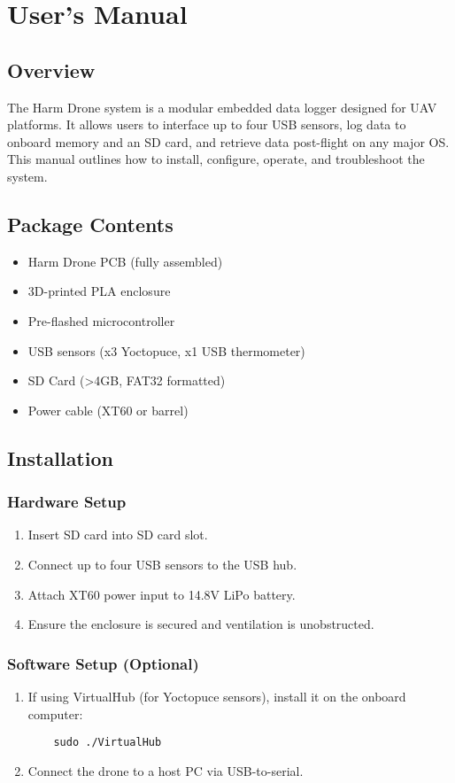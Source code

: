 \documentclass[../main.tex]{subfiles}
\begin{document}
\section{User’s Manual}

\subsection{Overview}
The Harm Drone system is a modular embedded data logger designed for UAV platforms. It allows users to interface up to four USB sensors, log data to onboard memory and an SD card, and retrieve data post-flight on any major OS. This manual outlines how to install, configure, operate, and troubleshoot the system.

\subsection{Package Contents}
\begin{itemize}
    \item Harm Drone PCB (fully assembled)
    \item 3D-printed PLA enclosure
    \item Pre-flashed microcontroller
    \item USB sensors (x3 Yoctopuce, x1 USB thermometer)
    \item SD Card (>4GB, FAT32 formatted)
    \item Power cable (XT60 or barrel)
\end{itemize}

\subsection{Installation}

\subsubsection{Hardware Setup}
\begin{enumerate}
    \item Insert SD card into SD card slot.
    \item Connect up to four USB sensors to the USB hub.
    \item Attach XT60 power input to 14.8V LiPo battery.
    \item Ensure the enclosure is secured and ventilation is unobstructed.
\end{enumerate}

\subsubsection{Software Setup (Optional)}
\begin{enumerate}
    \item If using VirtualHub (for Yoctopuce sensors), install it on the onboard computer:
    \begin{verbatim}
    sudo ./VirtualHub
    \end{verbatim}
    \item Connect the drone to a host PC via USB-to-serial.
\end{enumerate}
\end{document}

